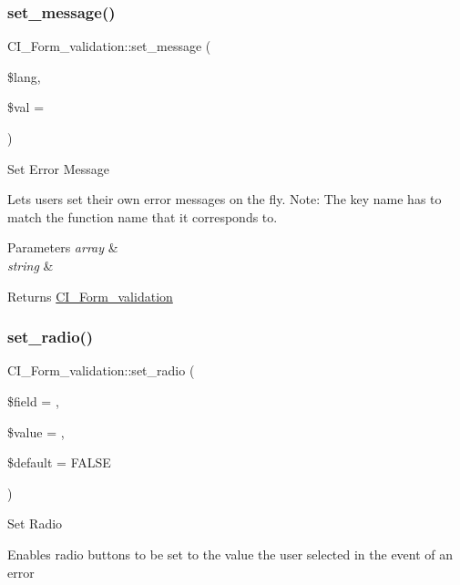 \subsubsection{\texorpdfstring{set\+\_\+message()}{set\_message()}}
{\footnotesize\ttfamily C\+I\+\_\+\+Form\+\_\+validation\+::set\+\_\+message (\begin{DoxyParamCaption}\item[{}]{\$lang,  }\item[{}]{\$val = {\ttfamily \textquotesingle{}\textquotesingle{}} }\end{DoxyParamCaption})}

Set Error Message

Lets users set their own error messages on the fly. Note\+: The key name has to match the function name that it corresponds to.


\begin{DoxyParams}{Parameters}
{\em array} & \\
\hline
{\em string} & \\
\hline
\end{DoxyParams}
\begin{DoxyReturn}{Returns}
\mbox{\hyperlink{class_c_i___form__validation}{C\+I\+\_\+\+Form\+\_\+validation}} 
\end{DoxyReturn}
\mbox{\label{class_c_i___form__validation_a0d72f27b7455e1416cb5cc7f0512179d}} 
\subsubsection{\texorpdfstring{set\+\_\+radio()}{set\_radio()}}
{\footnotesize\ttfamily C\+I\+\_\+\+Form\+\_\+validation\+::set\+\_\+radio (\begin{DoxyParamCaption}\item[{}]{\$field = {\ttfamily \textquotesingle{}\textquotesingle{}},  }\item[{}]{\$value = {\ttfamily \textquotesingle{}\textquotesingle{}},  }\item[{}]{\$default = {\ttfamily FALSE} }\end{DoxyParamCaption})}

Set Radio

Enables radio buttons to be set to the value the user selected in the event of an error


